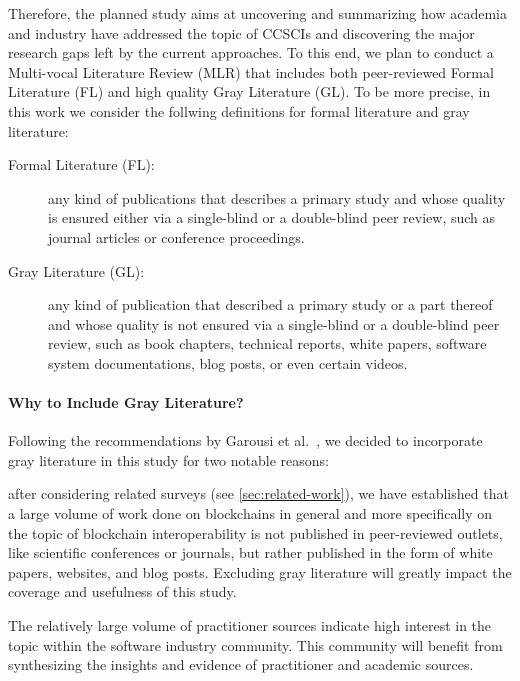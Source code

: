 \documentclass[review]{elsarticle}
\begin{document}
Therefore, the planned study aims at uncovering and summarizing how academia and industry have addressed the topic of CCSCIs and discovering the major research gaps left by the current approaches.
To this end, we plan to conduct a Multi-vocal Literature Review (MLR) that includes both peer-reviewed Formal Literature (FL) and high quality Gray Literature (GL).
To be more precise, in this work we consider the follwing definitions for formal literature and gray literature:
\begin{description}
	\item[Formal Literature (FL):] any kind of publications that describes a primary study and whose quality is ensured either via a single-blind or a double-blind peer review, such as journal articles or conference proceedings.
	
	\item[Gray Literature (GL):] any kind of publication that described a primary study or a part thereof and whose quality is not ensured via a single-blind or a double-blind peer review, such as book chapters, technical reports, white papers, software system documentations, blog posts, or even certain videos.
\end{description}


\paragraph{Why to Include Gray Literature?}
Following the recommendations by Garousi et al.~\cite{Garousi2017MLR}, we decided to incorporate gray literature in this study for two notable reasons:
\begin{inparaenum}[(i)]
	\item after considering related surveys (see \cref{sec:related-work}), we have established that a large volume of work done on blockchains in general and more specifically on the topic of blockchain interoperability is not published in peer-reviewed outlets, like scientific conferences or journals, but rather published in the form of white papers, websites, and blog posts.
	Excluding gray literature will greatly impact the coverage and usefulness of this study.
	\item The relatively large volume of practitioner sources indicate high interest in the topic within the software industry community.
	This community will benefit from synthesizing the insights and evidence of practitioner and academic sources.	
\end{inparaenum}
\end{document}
